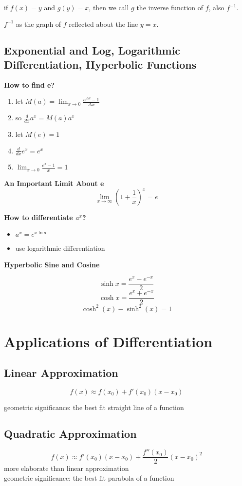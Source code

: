 \documentclass{article}
\newcommand\limitx[1]{\lim_{x \to #1}}
\begin{document}
if $f(x) = y$ and $g(y) = x$, then we call $g$ the inverse function of $f$, also $f^{-1}$.

$f^{-1}$ as the graph of $f$ reflected about the line $y = x$.

\subsection{Exponential and Log, Logarithmic Differentiation, Hyperbolic Functions}

\textbf{How to find e?}
\begin{enumerate}
  \item let $M(a) = \limitx{0}\frac{a^{\Delta x} - 1}{\Delta x}$
  \item so $\frac{d}{dx}a^x = M(a)a^x$
  \item let $M(e) = 1$
  \item $\frac{d}{dx}e^x = e^x$
  \item $\limitx{0}\frac{e^x - 1}{x} = 1$
\end{enumerate}

\textbf{An Important Limit About e}
$$\limitx{\infty}(1 + \frac{1}{x})^x = e$$

\textbf{How to differentiate $a^x$?}

\begin{itemize}
  \item $a^x = e^{x\ln a}$
  \item use logarithmic differentiation
\end{itemize}

\textbf{Hyperbolic Sine and Cosine}

$$\sinh x = \frac{e^x - e^{-x}}{2}$$
$$\cosh x = \frac{e^x + e^{-x}}{2}$$
$$\cosh ^2(x) - \sinh ^2(x) = 1$$

\section{Applications of Differentiation}
\subsection{Linear Approximation}

$$f(x) \approx f(x_0) + f'(x_0)(x-x_0)$$

geometric significance: the best fit straight line of a function

\subsection{Quadratic Approximation}
$$f(x) \approx f'(x_0)(x-x_0) + \frac{f''(x_0)}{2}(x-x_0)^2$$
more elaborate than linear approximation \\
geometric significance: the best fit parabola of a function
\end{document}
